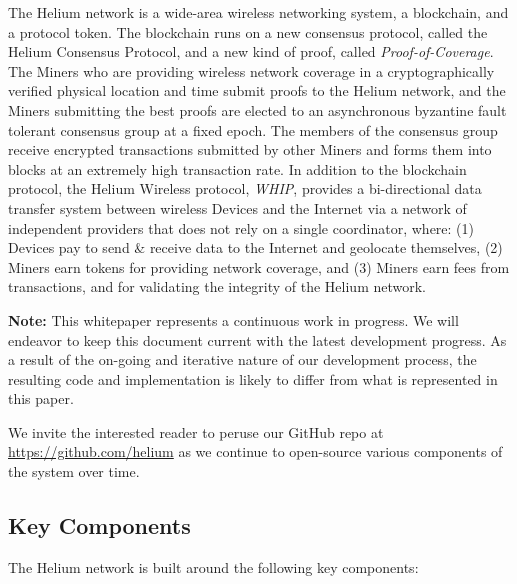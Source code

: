 \documentclass[10pt, nonatbib, nocopyrightspace, reprint]{sigplanconf}
\begin{document}
The Helium network is a wide-area wire\-less net\-working system, a block\-chain, and a protocol token. The blockchain runs on a new consensus protocol, called the Helium Consensus Protocol, and a new kind of proof, called \emph{Proof-of-Coverage}. The Miners who are providing wireless network coverage in a cryptographically verified physical location and time submit proofs to the Helium network, and the Miners submitting the best proofs are elected to an asynchronous byzantine fault tolerant consensus group at a fixed epoch. The members of the consensus group receive encrypted transactions submitted by other Miners and forms them into blocks at an extremely high transaction rate. In addition to the blockchain protocol, the Helium Wireless protocol, \emph{WHIP}, provides a bi-directional data transfer system between wireless Devices and the Internet via a network of independent providers that does not rely on a single coordinator, where: (1) Devices pay to send \& receive data to the Internet and geolocate themselves, (2) Miners earn tokens for providing network coverage, and (3) Miners earn fees from transactions, and for validating the integrity of the Helium network.

\textbf{Note:} This whitepaper represents a continuous work in progress. We will endeavor to keep this document current with the latest development progress. As a result of the on-going and iterative nature of our development process, the resulting code and implementation is likely to differ from what is represented in this paper.

We invite the interested reader to peruse our GitHub repo at \url{https://github.com/helium} as we continue to open-source various components of the system over time.

\subsection{Key Components}

The Helium network is built around the following key components:
\end{document}

